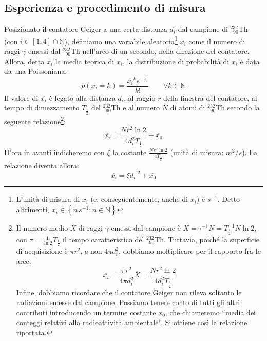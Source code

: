 \documentclass{article}
\newcommand*{\Th}{^{232}_{\;\;90} \text{Th}}
\begin{document}
\subsection{Esperienza e procedimento di misura}

Posizionato il contatore Geiger a una certa distanza $d_i$ dal campione di $\Th$
(con $i\in\left[1;4\right]\cap\mathbb{N}$),
definiamo una variabile aleatoria\footnote{
    L'unità di misura di $x_i$ (e, conseguentemente, anche di $\overline{x_i}$) è
    $\unit{s^{-1}}$. Detto altrimenti,
    $x_i\in\left\{n\,\unit{s^{-1}}:n\in\mathbb{N}\right\}$
} $x_i$ come il numero di raggi $\gamma$
emessi dal $\Th$ nell'arco di un secondo, nella direzione del contatore.
Allora, detta $\overline{x_i}$ la media teorica
di $x_i$, la distribuzione di probabilità di $x_i$ è data da una Poissoniana:
\[
    p(x_i=k)=\frac{\overline{x_i}^k e^{-\overline{x_i}}}{k!}
    \qquad
    \forall k\in\mathbb{N}
\]
Il valore di $\overline{x_i}$ è legato alla distanza $d_i$, al raggio $r$
della finestra del contatore, al tempo di dimezzamento $T_\frac{1}{2}$ del
$\Th$ e al numero $N$ di atomi di $\Th$ secondo la seguente relazione\footnote{
    Il numero medio $\overline{X}$ di raggi $\gamma$ emessi dal campione è
    $\overline{X} = \tau^{-1}N = {T^{-1}_\frac{1}{2}}N\ln{2}$,
    con $\tau=\frac{1}{\ln{2}}T_\frac{1}{2}$ il tempo caratteristico del $\Th$.
    Tuttavia, poiché la superficie di acquisizione è $\pi r^2$, e non $4\pi d_i^2$,
    dobbiamo moltiplicare per il rapporto fra le aree:
    \[
        \overline{x_i} = \frac{\pi r^2}{4\pi d_i^2} \overline{X} =
        \frac{Nr^2\ln{2}}{4 d_i^2 T_\frac{1}{2}}
    \]
    Infine, dobbiamo ricordare che il contatore Geiger non rileva soltanto le
    radiazioni emesse dal campione. Possiamo tenere conto di tutti gli altri
    contributi introducendo un termine costante $\overline{x_0}$, che chiameremo
    “media dei conteggi relativi alla radioattività ambientale”.
    Si ottiene così la relazione riportata.
}:
\[
    \overline{x_i} = \frac{Nr^2\ln{2}}{4 d_i^2 T_\frac{1}{2}} + \overline{x_0}
\]
D'ora in avanti indicheremo con $\xi$ la costante $\frac{Nr^2\ln{2}}{4T_\frac{1}{2}}$
(unità di misura: $\unit{m^2\per s}$).
La relazione diventa allora:
\[\overline{x_i} = \xi d_i^{-2} + \overline{x_0}\]
\end{document}
